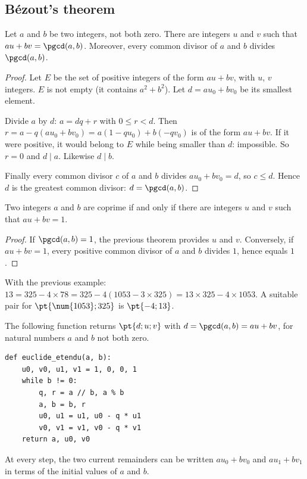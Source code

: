 \subsection{Bézout's theorem}
\begin{theorem}
Let $a$ and $b$ be two integers, not both zero. There are integers $u$ and $v$ such that $au+bv=\pgcd(a,b)$. Moreover, every common divisor of $a$ and $b$ divides $\pgcd(a,b)$.
\end{theorem}
\begin{proof}
Let $E$ be the set of positive integers of the form $au+bv$, with $u$, $v$ integers. $E$ is not empty (it contains $a^2+b^2$). Let $d=au_0+bv_0$ be its smallest element.\par
Divide $a$ by $d$: $a=dq+r$ with $0\le r<d$. Then $r=a-q(au_0+bv_0)=a(1-qu_0)+b(-qv_0)$ is of the form $au+bv$. If it were positive, it would belong to $E$ while being smaller than $d$: impossible. So $r=0$ and $d\mid a$. Likewise $d\mid b$.\par
Finally every common divisor $c$ of $a$ and $b$ divides $au_0+bv_0=d$, so $c\le d$. Hence $d$ is the greatest common divisor: $d=\pgcd(a,b)$.
\end{proof}
\begin{theorem}
Two integers $a$ and $b$ are coprime if and only if there are integers $u$ and $v$ such that $au+bv=1$.
\end{theorem}
\begin{proof}
If $\pgcd(a,b)=1$, the previous theorem provides $u$ and $v$. Conversely, if $au+bv=1$, every positive common divisor of $a$ and $b$ divides $1$, hence equals $1$.
\end{proof}
\begin{method}
With the previous example: $13=325-4\times78=325-4(\num{1053}-3\times325)=13\times325-4\times\num{1053}$. A suitable pair for $\pt{\num{1053};325}$ is $\pt{-4;13}$.
\end{method}
\begin{keypoint}
The following function returns $\pt{d;u;v}$ with $d=\pgcd(a,b)=au+bv$, for natural numbers $a$ and $b$ not both zero.
\begin{lstlisting}
def euclide_etendu(a, b):
    u0, v0, u1, v1 = 1, 0, 0, 1
    while b != 0:
        q, r = a // b, a % b
        a, b = b, r
        u0, u1 = u1, u0 - q * u1
        v0, v1 = v1, v0 - q * v1
    return a, u0, v0
\end{lstlisting}
At every step, the two current remainders can be written $au_0+bv_0$ and $au_1+bv_1$ in terms of the initial values of $a$ and $b$.
\end{keypoint}

